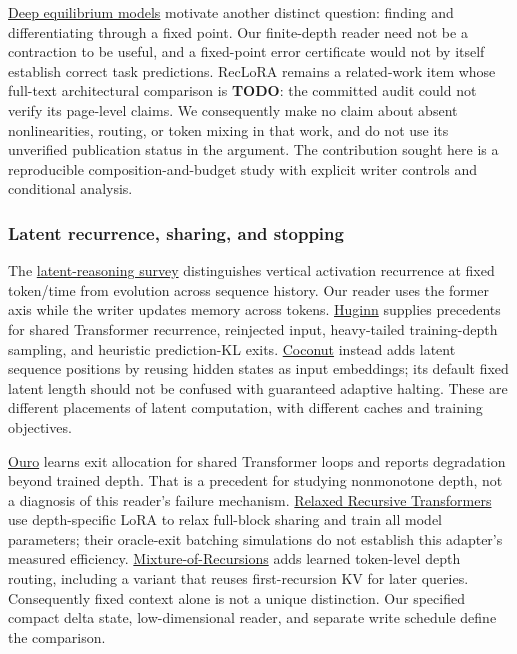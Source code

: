 \href{https://arxiv.org/abs/1909.01377}{Deep equilibrium models} motivate another distinct
question: finding and differentiating through a fixed point. Our finite-depth reader
need not be a contraction to be useful, and a fixed-point error certificate would not
by itself establish correct task predictions. RecLoRA remains a related-work item whose
full-text architectural comparison is \textbf{TODO}: the committed audit could not verify its
page-level claims. We consequently make no claim about absent nonlinearities, routing,
or token mixing in that work, and do not use its unverified publication status in the
argument. The contribution sought here is a reproducible composition-and-budget study
with explicit writer controls and conditional analysis.

\subsubsection*{Latent recurrence, sharing, and stopping}

The \href{https://arxiv.org/html/2507.06203v2}{latent-reasoning survey} distinguishes
vertical activation recurrence at fixed token/\allowbreak{}time from evolution across sequence
history. Our reader uses the former axis while the writer updates memory across
tokens. \href{https://arxiv.org/html/2502.05171v2}{Huginn} supplies precedents for shared
Transformer recurrence, reinjected input, heavy-tailed training-depth sampling,
and heuristic prediction-KL exits. \href{https://arxiv.org/html/2412.06769v4}{Coconut}
instead adds latent sequence positions by reusing hidden states as input embeddings;
its default fixed latent length should not be confused with guaranteed adaptive
halting. These are different placements of latent computation, with different caches
and training objectives.

\href{https://arxiv.org/pdf/2510.25741v6}{Ouro} learns exit allocation for shared Transformer
loops and reports degradation beyond trained depth. That is a precedent for studying
nonmonotone depth, not a diagnosis of this reader’s failure mechanism.
\href{https://arxiv.org/html/2410.20672v3}{Relaxed Recursive Transformers} use depth-specific
LoRA to relax full-block sharing and train all model parameters; their oracle-exit
batching simulations do not establish this adapter’s measured efficiency.
\href{https://arxiv.org/html/2507.10524v3}{Mixture-of-Recursions} adds learned token-level
depth routing, including a variant that reuses first-recursion KV for later queries.
Consequently fixed context alone is not a unique distinction. Our specified compact
delta state, low-dimensional reader, and separate write schedule define the comparison.


